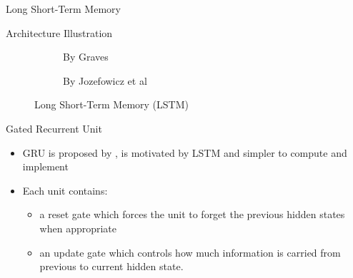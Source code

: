 \documentclass[12pt]{beamer}
\begin{document}
\begin{frame}{Long Short-Term Memory}
    \begin{alertblock}{Architecture Illustration}
        \begin{figure}[t!]
            \centering
            \setlength{\fboxsep}{1pt}%
            \setlength{\fboxrule}{0.5pt}%
            \begin{subfigure}[t]{0.5\textwidth}
                \centering
                \caption{By Graves \cite{DBLP:journals/corr/Graves13}}
            \end{subfigure}%
            \begin{subfigure}[t]{0.5\textwidth}
                \centering
                \caption{By Jozefowicz et al \cite{conf/icml/JozefowiczZS15}}
            \end{subfigure}
            \label{fig:sub1}
            \caption{Long Short-Term Memory (LSTM)}
        \end{figure}
    \end{alertblock}
\end{frame}

\begin{frame}{Gated Recurrent Unit}
    \begin{alertblock}{}
        \begin{itemize}
            \item GRU is proposed by \cite{cho14GRU}, is motivated by LSTM and simpler to compute and implement
            \item Each unit contains:
            \begin{itemize}
                \item a reset gate which forces the unit to forget the previous hidden states when appropriate
                \item an update gate which controls how much information is carried from previous to current hidden state.
               \end{itemize}
        \end{itemize}
    \end{alertblock}
\end{frame}
\end{document}
